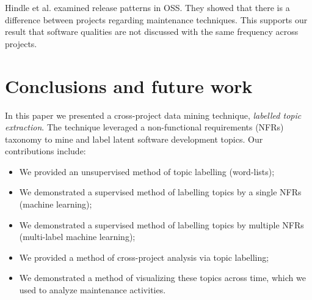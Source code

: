 \documentclass[]{sig-alternate}
\begin{document}
 Hindle et al. \cite{Hindle2007} examined release patterns in OSS. They showed that there is a difference between projects regarding maintenance techniques. This supports our result that software qualities are not discussed with the same frequency across projects.


\section{Conclusions and future work}


In this paper we presented a cross-project data mining technique, \emph{labelled topic extraction}. The technique leveraged  a non-functional requirements (NFRs) taxonomy to mine and label latent software development topics. %
Our contributions include:
\begin{itemize}
\item We provided an unsupervised method of topic labelling (word-lists);
\item We demonstrated a supervised method of labelling topics by a single NFRs (machine learning);
\item We demonstrated a supervised method of labelling topics by multiple NFRs (multi-label machine learning);
\item We provided a method of cross-project analysis via topic labelling;
\item We demonstrated a method of visualizing these topics across time, which we used to analyze maintenance activities.
\end{itemize}

\end{document}
